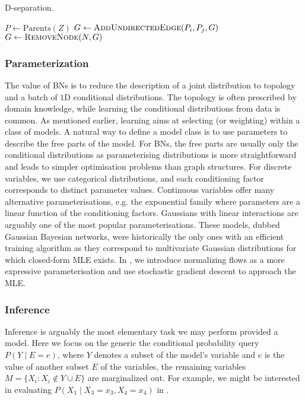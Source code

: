 \begin{algorithm}
\caption{D-separation.}\label{alg:d-separation}
  \begin{algorithmic}
      \State {}
        \State $P \gets \text{Parents}(Z)$ 
          \State $G \gets \Call{AddUndirectedEdge}{P_i, P_j, G}$
        \EndFor
        \State $G \gets \Call{RemoveNode}{N, G}$
      \EndFor
      \State {}
    \EndFunction
   \end{algorithmic}
\end{algorithm}

\subsubsection{Parameterization}
The value of BNs is to reduce the description of a joint distribution to topology and a batch of $1$D conditional distributions. The topology is often prescribed by domain knowledge, while learning the conditional distributions from data is common. As mentioned earlier, learning aims at selecting (or weighting) within a class of models. A natural way to define a model class is to use parameters to describe the free parts of the model. For BNs, the free parts are usually only the conditional distributions as parameterising distributions is more straightforward and leads to simpler optimisation problems than graph structures. For discrete variables, we use categorical distributions, and each conditioning factor corresponds to distinct parameter values. Continuous variables offer many alternative parameterisations, e.g. the exponential family where parameters are a linear function of the conditioning factors. Gaussians with linear interactions are arguably one of the most popular parameterisations. These models, dubbed Gaussian Bayesian networks, were historically the only ones with an efficient training algorithm as they correspond to multivariate Gaussian distributions \citep{wermuth1980linear} for which closed-form MLE exists. In , we introduce normalizing flows as a more expressive parameterisation and use stochastic gradient descent to approach the MLE.
\subsubsection{Inference}
Inference is arguably the most elementary task we may perform provided a model. Here we focus on the generic the conditional probability query $P(Y\mid E=e)$, where $Y$ denotes a subset of the model's variable and $e$ is the value of another subset $E$ of the variables, the remaining variables $M = \{X_i: X_i \notin Y \cup E \}$ are marginalized out. For example, we might be interested in evaluating $P(X_1\mid X_3=x_3, X_4=x_4)$ in .

